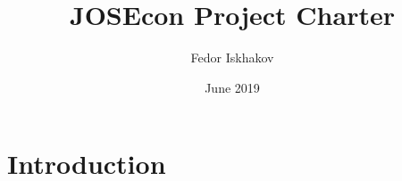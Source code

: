 \documentclass{article}
\title{JOSEcon Project Charter}
\author{Fedor Iskhakov}
\date{June 2019}
\begin{document}
\maketitle

\section{Introduction}
\end{document}
